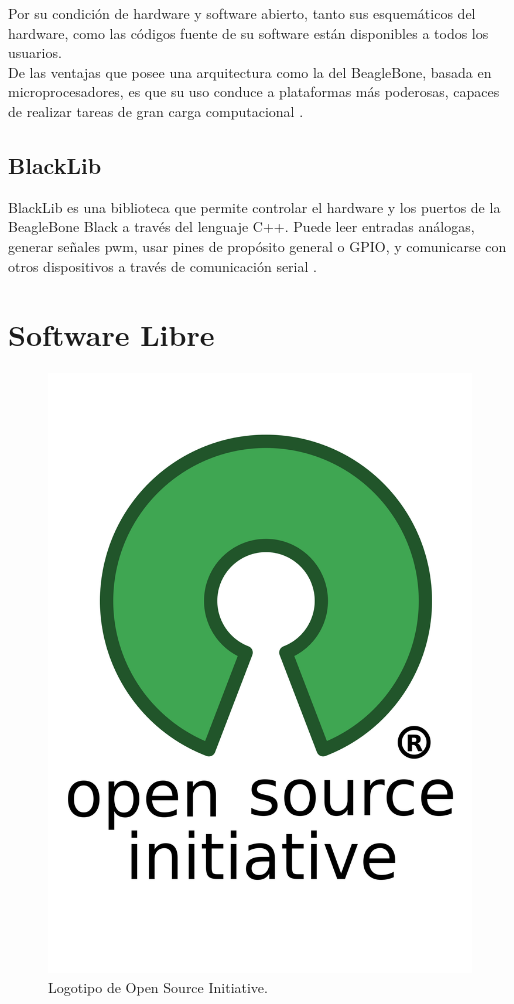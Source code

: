 Por su condición de hardware y software abierto, tanto sus esquemáticos del hardware, como las códigos fuente de su software están disponibles a todos los usuarios. \\

De las ventajas que posee una arquitectura como la del BeagleBone, basada en microprocesadores, es que su uso conduce a plataformas más poderosas, capaces de realizar tareas de gran carga computacional \citep{coley2013beaglebone}.

\subsection{BlackLib}

BlackLib es una biblioteca que permite controlar el hardware y los puertos de la BeagleBone Black a través del lenguaje C++. Puede leer entradas análogas, generar señales pwm, usar pines de propósito general o GPIO, y comunicarse con otros dispositivos a través de comunicación serial \citep{blacklib}.

\section{Software Libre}

\begin{figure}[H]
\centering
\includegraphics[scale=0.15]{Figures/opens}
\caption[Logotipo de Open Source Initiative.]{Logotipo de Open Source Initiative\footnotemark.}
\label{fig:opens}
\end{figure}

